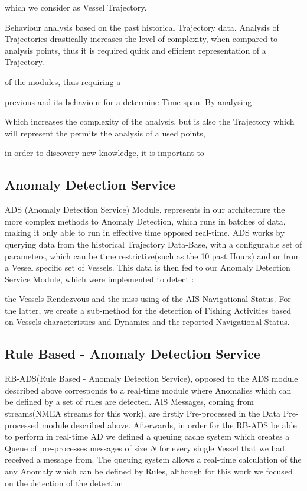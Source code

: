 which we consider as Vessel Trajectory. 

Behaviour analysis based on the past historical Trajectory data. Analysis of Trajectories drastically increases the level of complexity, when compared to analysis points, thus it is required quick and efficient representation of a Trajectory.


of the modules, thus requiring a 

previous  and its behaviour for a determine Time span. By analysing   

Which increases the complexity of the analysis, but is also the 
Trajectory which will represent the   permits the analysis of a used points,   


in order to discovery new knowledge, it is important to 


\subsection{Anomaly Detection Service}
ADS (Anomaly Detection Service) Module, represents in our architecture the more complex methods to Anomaly Detection, which runs in batches of data, making it only able to run in effective time opposed real-time. ADS works by querying data from the historical Trajectory Data-Base, with a configurable set of parameters, which can be time restrictive(such as the 10 past Hours) and or from a Vessel specific set of Vessels. This data is then fed to our Anomaly Detection Service Module, which were implemented to detect :

the Vessels Rendezvous and the miss using of the AIS Navigational Status.
For the latter, we create a sub-method for the detection of Fishing Activities based on Vessels characteristics and Dynamics and the reported Navigational Status.


\subsection{Rule Based - Anomaly Detection Service}
RB-ADS(Rule Based - Anomaly Detection Service), opposed to the ADS module described above corresponds to a real-time module where Anomalies which can be defined by a set of rules are detected.
AIS Messages, coming from streams(NMEA streams for this work), are firstly Pre-processed in the Data Pre-processed module described above. Afterwards, in order for the RB-ADS be able to perform in real-time AD we defined a queuing cache system which creates a Queue of pre-processes messages of size $N$ for every single Vessel that we had received a message from. 
The queuing system allows a real-time calculation of the any Anomaly which can be defined by Rules, although for this work we focused on the detection of the detection    

